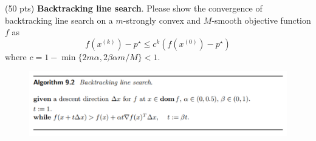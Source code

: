 \item {\color{red} (50 pts)} \textbf{Backtracking line search}. Please show the convergence of backtracking line search on a $m$-strongly convex and $M$-smooth objective function $f$ as
$$
f\left(x^{(k)}\right)-p^{\star} \leq c^k\left(f\left(x^{(0)}\right)-p^{\star}\right)
$$
where $c=1-\min \{2 m \alpha, 2 \beta \alpha m / M\}<1$.

\begin{figure}[htbp]
    \centering
	\includegraphics[width=1\textwidth]{./image/backtracking.png}
\end{figure}

\solution{}







